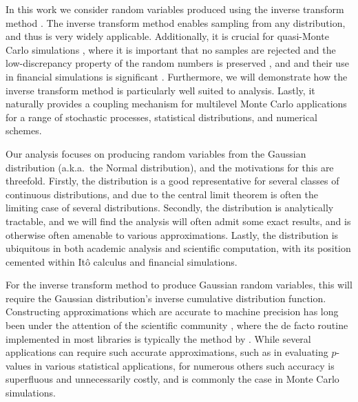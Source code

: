 \documentclass[manuscript,review]{acmart}
\begin{document}
In this work we consider random variables produced using the inverse transform method \citep{glasserman2013monte}. The inverse transform method enables sampling from any distribution, and thus is very widely applicable. Additionally, it is crucial for quasi-Monte Carlo simulations \citep{giles2009multilevel_qmc,lecuyer2016randomized}, where it is important that no samples are rejected and the low-discrepancy property of the random numbers is preserved \citep{tezuka1995uniform}, and and their use in financial simulations is significant \citep{joy1996quasi,xu2015high}. Furthermore, we will demonstrate how the inverse transform method is particularly well suited to analysis. Lastly, it naturally provides a coupling mechanism for multilevel Monte Carlo applications for a range of stochastic processes, statistical distributions, and numerical schemes. 

Our analysis focuses on producing random variables from the Gaussian distribution (a.k.a.\ the Normal distribution), and the motivations for this are threefold. Firstly, the distribution is a good representative for several classes of continuous distributions, and due to the central limit theorem is often the limiting case of several distributions. Secondly, the distribution is analytically tractable, and we will find the analysis will often admit some exact results, and is otherwise often amenable to various approximations. Lastly, the distribution is ubiquitous in both academic analysis and scientific computation, with its position cemented within It\^{o} calculus and financial simulations. 

For the inverse transform method to produce Gaussian random variables, this will require the Gaussian distribution's inverse cumulative distribution function. Constructing approximations which are accurate to machine precision has long been under the attention of the scientific community \citep{hastings1955approximations,evans1974algorithm70,beasley1985percentage,wichura1988algorithm,marsaglia1994rapid,giles2011approximating}, where the de facto routine implemented in most libraries is typically the method by \citet{wichura1988algorithm}. While several applications can require such accurate approximations, such as in evaluating $ p $-values in various statistical applications, for numerous others such accuracy is superfluous and unnecessarily costly, and is commonly the case in Monte Carlo simulations. 
\end{document}
